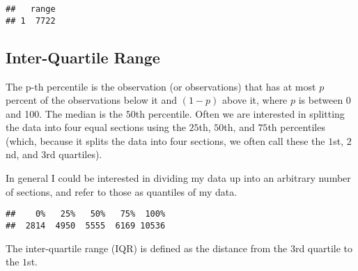 \documentclass[]{book}
\newenvironment{Shaded}{\begin{snugshade}}{\end{snugshade}}
\newcommand{\KeywordTok}[1]{\textcolor[rgb]{0.13,0.29,0.53}{\textbf{{#1}}}}
\newcommand{\StringTok}[1]{\textcolor[rgb]{0.31,0.60,0.02}{{#1}}}
\newcommand{\CommentTok}[1]{\textcolor[rgb]{0.56,0.35,0.01}{\textit{{#1}}}}
\newcommand{\NormalTok}[1]{{#1}}
\begin{document}
\begin{verbatim}
##   range
## 1  7722
\end{verbatim}

\subsection{Inter-Quartile Range}\label{inter-quartile-range}

The p-th percentile is the observation (or observations) that has at
most \(p\) percent of the observations below it and \((1-p)\) above it,
where \(p\) is between 0 and 100. The median is the \(50\)th percentile.
Often we are interested in splitting the data into four equal sections
using the \(25\)th, \(50\)th, and \(75\)th percentiles (which, because
it splits the data into four sections, we often call these the \(1\)st,
\(2\)nd, and \(3\)rd quartiles).

In general I could be interested in dividing my data up into an
arbitrary number of sections, and refer to those as quantiles of my
data.

\begin{Shaded}
\end{Shaded}

\begin{verbatim}
##    0%   25%   50%   75%  100% 
##  2814  4950  5555  6169 10536
\end{verbatim}

\begin{Shaded}
\end{Shaded}

The inter-quartile range (IQR) is defined as the distance from the
\(3\)rd quartile to the \(1\)st.

\begin{Shaded}
\end{Shaded}
\end{document}
